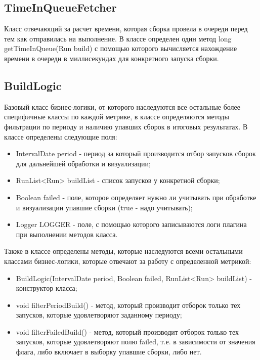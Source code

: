 \subsection{TimeInQueueFetcher}

Класс отвечающий за расчет времени, которая сборка провела в очереди перед тем как отправилась на выполнение. В классе определен один метод long getTimeInQueue(Run build) с помощью которого вычисляется нахождение времени в очереди в миллисекундах для конкретного запуска сборки.

\subsection{BuildLogic}
	
Базовый класс бизнес-логики, от которого наследуются все остальные более специфичные классы по каждой метрике, в классе определяются методы фильтрации по периоду и наличию упавших сборок в итоговых результатах. В классе определены следующие поля:

\begin{itemize}
	\item IntervalDate period - период за который производится отбор запусков сборок для дальнейшей обработки и визуализации;
	\item RunList<Run> buildList - список запусков у конкретной сборки;
	\item Boolean failed - поле, которое определяет нужно ли учитывать при обработке и визуализации упавшие сборки (true - надо учитывать);
	\item Logger LOGGER - поле, с помощью которого записываются логи плагина при выполнении методов класса.
\end{itemize}

Также в классе определены методы, которые наследуются всеми остальными классами бизнес-логики, которые отвечают за работу с определенной метрикой:

\begin{itemize}
	\item BuildLogic(IntervalDate period, Boolean failed, RunList<Run> buildList) - конструктор класса;
	\item void filterPeriodBuild() - метод, который производит отборок только тех запусков, которые удовлетворяют заданному периоду;
	\item void filterFailedBuild() - метод, который производит отборок только тех запусков, которые удовлетворяют полю failed, т.е. в зависимости от значения флага, либо включает в выборку упавшие сборки, либо нет.
\end{itemize}

